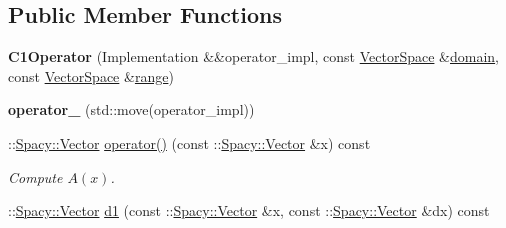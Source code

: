 \subsection*{\-Public \-Member \-Functions}
\begin{DoxyCompactItemize}
\item 
\hypertarget{classSpacy_1_1dealII_1_1C1Operator_a2eae8e3f6aea4551ebba3e639f89ab34}{{\bfseries \-C1\-Operator} (\-Implementation \&\&operator\-\_\-impl, const \hyperlink{classSpacy_1_1VectorSpace}{\-Vector\-Space} \&\hyperlink{classSpacy_1_1OperatorBase_a2588f9b3e0188820c4c494e63293dc6f}{domain}, const \hyperlink{classSpacy_1_1VectorSpace}{\-Vector\-Space} \&\hyperlink{classSpacy_1_1OperatorBase_ab19d3b7a6f290b1079248f1e567e53d6}{range})}\label{classSpacy_1_1dealII_1_1C1Operator_a2eae8e3f6aea4551ebba3e639f89ab34}

\item 
\hypertarget{classSpacy_1_1dealII_1_1C1Operator_a6e698e6741c399f302cd0f7f3d01a39f}{{\bfseries operator\-\_\-} (std\-::move(operator\-\_\-impl))}\label{classSpacy_1_1dealII_1_1C1Operator_a6e698e6741c399f302cd0f7f3d01a39f}

\item 
\hypertarget{classSpacy_1_1dealII_1_1C1Operator_afb5df65e8e89f6ac159bbb859ad9799c}{\-::\hyperlink{classSpacy_1_1Vector}{\-Spacy\-::\-Vector} \hyperlink{classSpacy_1_1dealII_1_1C1Operator_afb5df65e8e89f6ac159bbb859ad9799c}{operator()} (const \-::\hyperlink{classSpacy_1_1Vector}{\-Spacy\-::\-Vector} \&x) const }\label{classSpacy_1_1dealII_1_1C1Operator_afb5df65e8e89f6ac159bbb859ad9799c}

\begin{DoxyCompactList}\small\item\em \-Compute $A(x)$. \end{DoxyCompactList}\item 
\hypertarget{classSpacy_1_1dealII_1_1C1Operator_a766d636022666719cb92dd3b272e9fb7}{\-::\hyperlink{classSpacy_1_1Vector}{\-Spacy\-::\-Vector} \hyperlink{classSpacy_1_1dealII_1_1C1Operator_a766d636022666719cb92dd3b272e9fb7}{d1} (const \-::\hyperlink{classSpacy_1_1Vector}{\-Spacy\-::\-Vector} \&x, const \-::\hyperlink{classSpacy_1_1Vector}{\-Spacy\-::\-Vector} \&dx) const }\label{classSpacy_1_1dealII_1_1C1Operator_a766d636022666719cb92dd3b272e9fb7}


\end{DoxyCompactItemize}
